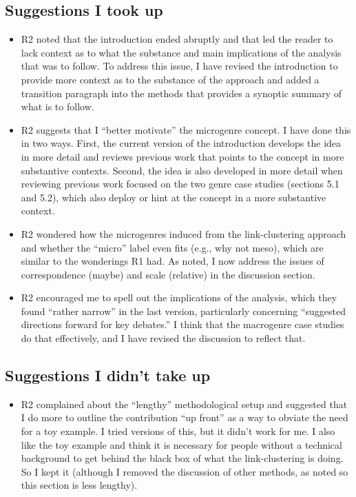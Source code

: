 \documentclass[a4paper,12pt]{extarticle}
\begin{document}
\subsection{Suggestions I took up}
\begin{itemize}
    \item R2 noted that the introduction ended abruptly and that led the reader to lack context as to what the substance and main implications of the analysis that was to follow. To address this issue, I have revised the introduction to provide more context as to the substance of the approach and added a transition paragraph into the methods that provides a synoptic summary of what is to follow. 
    \item R2 suggests that I ``better motivate'' the microgenre concept. I have done this in two ways. First, the current version of the introduction develops the idea in more detail and reviews previous work that points to the concept in more substantive contexts. Second, the idea is also developed in more detail when reviewing previous work focused on the two genre case studies (sections 5.1 and 5.2), which also deploy or hint at the concept in a more substantive context. 
    \item R2 wondered how the microgenres induced from the link-clustering approach and whether the ``micro'' label even fits (e.g., why not meso), which are similar to the wonderings R1 had. As noted, I now address the issues of correspondence (maybe) and scale (relative) in the discussion section.
    \item R2 encouraged me to spell out the implications of the analysis, which they found ``rather narrow'' in the last version, particularly concerning ``suggested directions forward for key debates.'' I think that the macrogenre case studies do that effectively, and I have revised the discussion to reflect that.  
\end{itemize}

\subsection{Suggestions I didn't take up}
\begin{itemize}
    \item R2 complained about the ``lengthy'' methodological setup and suggested that I do more to outline the contribution ``up front'' as a way to obviate the need for a toy example. I tried versions of this, but it didn't work for me. I also like the toy example and think it is necessary for people without a technical background to get behind the black box of what the link-clustering is doing. So I kept it (although I removed the discussion of other methods, as noted so this section is less lengthy).  
\end{itemize}
\end{document}
